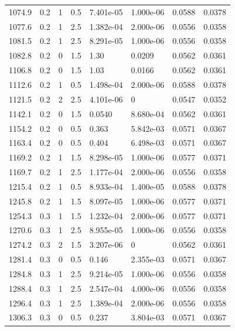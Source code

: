 \documentclass[preview]{standalone}
\begin{document}
{{{\begin{tabular}{L{1.2cm}C{1.2cm} C{0.3cm}C{0.5cm} C{1.4cm}C{1.4cm} C{1.4cm}C{1.4cm}}
  1074.9  &   0.2  & 1     & 0.5 &  7.401e-05  & 1.000e-06  & 0.0588 &  0.0378   \\ 
  1077.6  &   0.2  & 1     & 2.5 &  1.382e-04  & 2.000e-06  & 0.0556 &  0.0358   \\ 
  1081.5  &   0.2  & 1     & 2.5 &  8.291e-05  & 1.000e-06  & 0.0556 &  0.0358   \\ 
  1082.8  &   0.2  & 0     & 1.5 &  1.30  & 0.0209  & 0.0562 &  0.0361   \\ 
  1106.8  &   0.2  & 0     & 1.5 &  1.03  & 0.0166  & 0.0562 &  0.0361   \\ 
  1112.6  &   0.2  & 1     & 0.5 &  1.498e-04  & 2.000e-06  & 0.0588 &  0.0378   \\ 
  1121.5  &   0.2  & 2     & 2.5 &  4.101e-06  & 0  & 0.0547 &  0.0352   \\ 
  1142.1  &   0.2  & 0     & 1.5 &  0.0540  & 8.680e-04  & 0.0562 &  0.0361   \\ 
  1154.2  &   0.2  & 0     & 0.5 &  0.363  & 5.842e-03  & 0.0571 &  0.0367   \\ 
  1163.4  &   0.2  & 0     & 0.5 &  0.404  & 6.498e-03  & 0.0571 &  0.0367   \\ 
  1169.2  &   0.2  & 1     & 1.5 &  8.298e-05  & 1.000e-06  & 0.0577 &  0.0371   \\ 
  1169.7  &   0.2  & 1     & 2.5 &  1.177e-04  & 2.000e-06  & 0.0556 &  0.0358   \\ 
  1215.4  &   0.2  & 1     & 0.5 &  8.933e-04  & 1.400e-05  & 0.0588 &  0.0378   \\ 
  1245.8  &   0.2  & 1     & 1.5 &  8.097e-05  & 1.000e-06  & 0.0577 &  0.0371   \\ 
  1254.3  &   0.3  & 1     & 1.5 &  1.232e-04  & 2.000e-06  & 0.0577 &  0.0371   \\ 
  1270.6  &   0.3  & 1     & 2.5 &  8.955e-05  & 1.000e-06  & 0.0556 &  0.0358   \\ 
  1274.2  &   0.3  & 2     & 1.5 &  3.207e-06  & 0  & 0.0562 &  0.0361   \\ 
  1281.4  &   0.3  & 0     & 0.5 &  0.146  & 2.355e-03  & 0.0571 &  0.0367   \\ 
  1284.8  &   0.3  & 1     & 2.5 &  9.214e-05  & 1.000e-06  & 0.0556 &  0.0358   \\ 
  1288.4  &   0.3  & 1     & 2.5 &  2.547e-04  & 4.000e-06  & 0.0556 &  0.0358   \\ 
  1296.4  &   0.3  & 1     & 2.5 &  1.389e-04  & 2.000e-06  & 0.0556 &  0.0358   \\ 
  1306.3  &   0.3  & 0     & 0.5 &  0.237  & 3.804e-03  & 0.0571 &  0.0367   \\ 

\end{tabular}}}}
\end{document}
